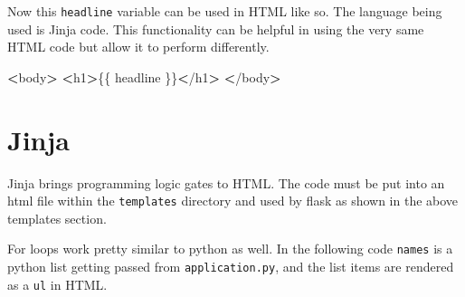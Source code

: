 \documentclass[]{book}
\newenvironment{Shaded}{\begin{snugshade}}{\end{snugshade}}
\newcommand{\OperatorTok}[1]{\textcolor[rgb]{0.81,0.36,0.00}{\textbf{#1}}}
\newcommand{\ExtensionTok}[1]{#1}
\newcommand{\NormalTok}[1]{#1}
\begin{document}
Now this \texttt{headline} variable can be used in HTML like so. The
language being used is Jinja code. This functionality can be helpful in
using the very same HTML code but allow it to perform differently.

\begin{Shaded}
\begin{Highlighting}[]
\OperatorTok{<}\ExtensionTok{body}\OperatorTok{>}
    \OperatorTok{<}\ExtensionTok{h1}\OperatorTok{>}\NormalTok{\{\{ headline \}\}}\OperatorTok{<}\NormalTok{/}\ExtensionTok{h1}\OperatorTok{>}
\OperatorTok{<}\NormalTok{/}\ExtensionTok{body}\OperatorTok{>}
\end{Highlighting}
\end{Shaded}

\section{Jinja}\label{jinja}

Jinja brings programming logic gates to HTML. The code must be put into
an html file within the \texttt{templates} directory and used by flask
as shown in the above templates section.

\begin{Shaded}
\end{Shaded}

For loops work pretty similar to python as well. In the following code
\texttt{names} is a python list getting passed from
\texttt{application.py}, and the list items are rendered as a
\texttt{ul} in HTML.

\begin{Shaded}
\end{Shaded}
\end{document}
